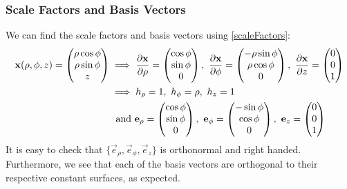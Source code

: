 \documentclass[../main.tex]{subfiles}
\begin{document}
\subsubsection{Scale Factors and Basis Vectors}
\label{scaleBasisCylindrical}
We can find the scale factors and basis vectors using \cref{scaleFactors}:
\begin{align*}
  \vec{x}(\rho, \phi, z) = \begin{pmatrix}
  \rho \cos \phi \\
  \rho \sin \phi \\
  z \\
  \end{pmatrix} &\implies
  \pderiv{\vec{x}}{\rho} = \begin{pmatrix}
  \cos \phi \\
  \sin \phi \\
  0 \\
  \end{pmatrix},\
  \pderiv{\vec{x}}{\phi} = \begin{pmatrix}
  -\rho \sin \phi \\
  \rho \cos \phi \\
  0 \\
  \end{pmatrix},\ \pderiv{\vec{x}}{z} = \begin{pmatrix}
  0 \\
  0 \\
  1 \\
  \end{pmatrix} \\
  &\implies
  h_\rho = 1,\
  h_\phi = \rho,\
  h_z = 1\\
  &\ \text{ and }
  \vec{e}_\rho = \begin{pmatrix}
  \cos \phi \\
  \sin \phi \\
  0 \\
  \end{pmatrix},\
  \vec{e}_\phi = \begin{pmatrix}
  -\sin \phi \\
  \cos \phi \\
  0 \\
  \end{pmatrix},\
  \vec{e}_z = \begin{pmatrix}
  0 \\
  0 \\
  1 \\
  \end{pmatrix}
\end{align*}
It is easy to check that $\{\vec{e}_\rho, \vec{e}_\phi, \vec{e}_z\}$ is orthonormal and right handed.
Furthermore, we see that each of the basis vectors are orthogonal to their respective constant surfaces, as expected.
\end{document}
